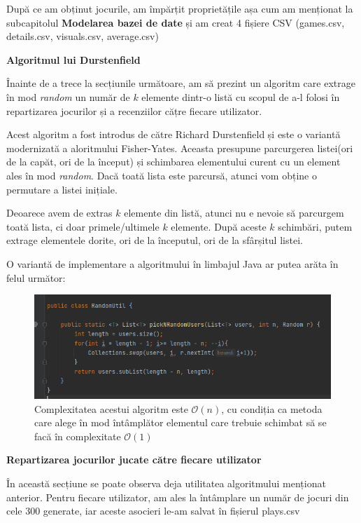 \documentclass[12pt,a4paper]{report}
\begin{document}
După ce am obținut jocurile, am împărțit proprietățile așa cum am menționat la subcapitolul \textbf{Modelarea bazei de date} și am creat 4 fișiere CSV (games.csv, details.csv, visuals.csv, average.csv)

\bigskip
\textbf{Algoritmul lui Durstenfield}
\bigskip

Înainte de a trece la secțiunile următoare, am să prezint un algoritm care extrage în mod \emph{random} un număr de \( k\) elemente dintr-o listă cu scopul de a-l folosi în repartizarea jocurilor și a recenziilor cățre fiecare utilizator.

Acest algoritm a fost introdus de către Richard Durstenfield și este o variantă modernizată a aloritmului Fisher-Yates. \cite{16} Aceasta presupune parcurgerea listei(ori de la capăt, ori de la început) și schimbarea elementului curent cu un element ales în mod \emph{random}. Dacă toată lista este parcursă, atunci vom obține o permutare a listei inițiale.

Deoarece avem de extras \( k \) elemente din listă, atunci nu e nevoie să parcurgem toată lista, ci doar primele/ultimele \( k \) elemente. După aceste \( k \) schimbări, putem extrage elementele dorite, ori de la începutul, ori de la sfârșitul listei.

O variantă de implementare a algoritmului în limbajul Java ar putea arăta în felul următor:

\begin{figure}[H]
\centering
\caption{}
\includegraphics[scale = 0.8]{exemplu_11_random}
\caption*{Complexitatea acestui algoritm este \(\mathcal{O}(n) \), cu condiția ca metoda care alege în mod întâmplător elementul care trebuie schimbat să se facă în complexitate \(\mathcal{O}(1) \) }
\end{figure}

\bigskip
\textbf{Repartizarea jocurilor jucate către fiecare utilizator}
\bigskip

În această secțiune se poate observa deja utilitatea algoritmului menționat anterior. Pentru fiecare utilizator, am ales la întâmplare un număr de jocuri din cele 300 generate, iar aceste asocieri le-am salvat în fișierul plays.csv
\end{document}
